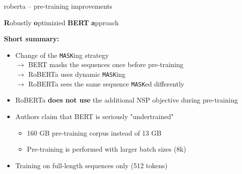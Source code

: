 \documentclass[11pt,compress,t,notes=noshow, xcolor=table]{beamer}
\begin{document}
\begin{frame}{roberta -- pre-training improvements}

\vfill

\textbf{R}obustly \textbf{o}ptimizied \textbf{BERT} \textbf{a}pproach \\ \medskip\medskip

\textbf{Short summary:}

	\begin{itemize}
		\item Change of the \texttt{MASK}ing strategy  \\
					$\to$ BERT masks the sequences once before pre-training  \\
					$\to$ RoBERTa uses dynamic \texttt{MASK}ing  \\
					$\to$ RoBERTa sees the same sequence \texttt{MASK}ed differently
		\item RoBERTa \textbf{does not use} the additional NSP objective during pre-training
		\item Authors claim that BERT is seriously "undertrained"
			\begin{itemize}
				\item 160 GB pre-training corpus instead of 13 GB
				\item Pre-training is performed with larger batch sizes (8k)
			\end{itemize}
		\item Training on full-length sequences only (512 tokens)
	\end{itemize}
	
\vfill

\end{frame}
\end{document}
